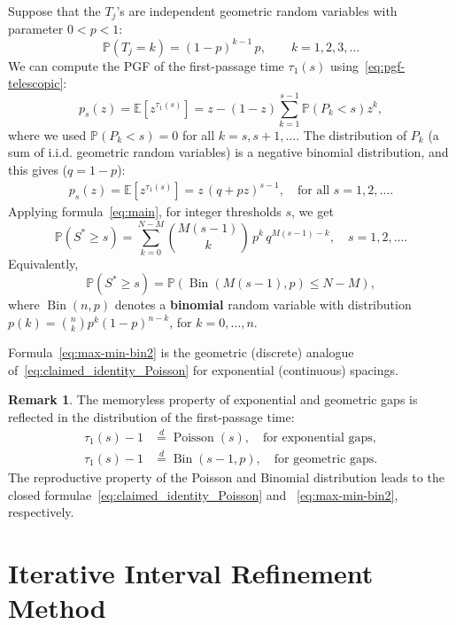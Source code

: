 \documentclass[a4paper,reqno,11pt]{amsart}
\numberwithin{equation}{section}
\def\PR{\mathbb{P}}
\def\EE{{\mathbb E}}
\def\PP{{\mathbb P}}
\numberwithin{thm}{section}
\theoremstyle{plain}
\theoremstyle{definition}
\newtheorem{rem}[thm]{Remark}
\begin{document}
{Suppose that the $T_j$'s are independent geometric random variables  with parameter $0<p<1$:
\[
  \PR(T_{{j}}=k)=(1-p)^{k-1}\,p, \qquad k=1,2,3,\ldots
\] 
We can compute  the PGF of the first-passage time $\tau_1(s)$ using~\eqref{eq:pgf-telescopic}:
\[
p_s(z) = \EE[z^{\tau_1(s)}]=z-(1-z)\sum_{k=1}^{s-1}\PP\left(P_k<s\right)z^k,
\]
where we used $\PP\left(P_k<s\right)=0$ for all $k=s,s+1,\ldots$. The distribution of $P_k$ (a sum of i.i.d. geometric random variables) is a negative binomial distribution, and this gives ($q=1-p$):
\begin{align}
  p_s(z) = \EE[z^{\tau_1(s)}]=z\,(q+pz)^{s-1},\quad \text{for all $s=1,2,\ldots$}.
  \label{eq:pgf-geom}
\end{align}
Applying formula~\eqref{eq:main}, for integer thresholds $s$, we get
\begin{equation}
\label{eq:max-min-bin}
    \PR(S^*\ge s)
  =  \sum_{k=0}^{N-M}\binom{M(s-1)}{k}\,p^k\,q^{M(s-1)-k},\quad s=1,2,\ldots.
\end{equation}
Equivalently,
\begin{equation}
\label{eq:max-min-bin2}
    \PR(S^*\ge s)
  = \PR\left(\operatorname{Bin}(M(s-1),p)\le N{-}M\right),
\end{equation}
where $\operatorname{Bin}(n,p)$ denotes a \textbf{binomial} random variable with  distribution $p(k)=\binom{n}{k}p^k(1-p)^{n-k}$, for $k=0,\ldots, n$.

Formula~\eqref{eq:max-min-bin2} is the geometric (discrete) analogue of~\eqref{eq:claimed_identity_Poisson} for exponential (continuous) spacings.


\begin{rem}
\label{rem:memoryless}
    The memoryless property of exponential and geometric gaps is reflected in the distribution of the
first-passage time:
\begin{align}
    \tau_1(s)-1 &\stackrel{d}{=} \operatorname{Poisson}(s),\quad \text{for exponential gaps},\\
\tau_1(s)-1&\stackrel{d}{=}\operatorname{Bin}(s-1,p),\quad \text{for geometric gaps}.
\end{align}
The reproductive property of the Poisson and Binomial distribution leads to the closed formulae~\eqref{eq:claimed_identity_Poisson} and ~\eqref{eq:max-min-bin2}, respectively.
\end{rem}


\section{Iterative Interval Refinement Method}
\label{sec:num}

}
\end{document}
